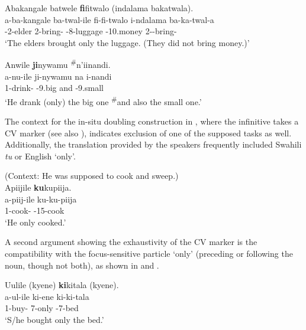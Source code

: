\documentclass[output=paper]{langscibook}
\begin{document}
\ea
\label{bkm:Ref56943215}
Abakangale batwele \textbf{fi}fitwalo (indalama bakatwala).\\
\gll
a-ba-kangale  ba-twal-ile  fi-fi-twalo  i-ndalama  ba-ka-twal-a\\
\AUG{}-2-elder  2\SM{}-bring-\PFV{}  \EXH{}-8-luggage  \AUG{}-10.money  2\SM-\NEG{}-bring-\FV{}\\
\glt
‘The elders brought only the luggage. (They did not bring money.)’ \citep[336]{vanderWalLusekelo2022}\\

\z
\pagebreak

\ea
\label{bkm:Ref56945748}
Anwile \textbf{ji}nywamu \textsuperscript{\#}n’iinandi.\\
\gll
a-nu-ile  ji-nywamu  na  i-nandi\\
1\SM{}-drink-\PFV{}  \EXH{}-9.big  and  \AUG{}-9.small\\
\glt
‘He drank (only) the big one \textsuperscript{\#}and also the small one.’ \citep[336]{vanderWalLusekelo2022}\\

\z


The context for the in-situ doubling construction in , where the infinitive takes a CV marker (see also ), indicates exclusion of one of the supposed tasks as well. Additionally, the translation provided by the speakers frequently included Swahili \textit{tu} or English ‘only’.

\ea
\label{bkm:Ref56943235}
(Context: He was supposed to cook and sweep.)\\
Apiijile \textbf{ku}kupiija.\\
\gll
a-piij-ile  ku-ku-piija\\
1\SM{}-cook-\PFV{}  \EXH{}-15-cook\\
\glt
‘He only cooked.’ \citep[336]{vanderWalLusekelo2022}\\

\z


A second argument showing the exhaustivity of the CV marker is the compatibility with the focus-sensitive particle ‘only’ (preceding or following the noun, though not both), as shown in  and .

\ea
\label{bkm:Ref122591578}
Uulile (kyene) \textbf{ki}kitala (kyene).\\
\gll
a-ul-ile  ki-ene  ki-ki-tala\\
1\SM{}-buy-\PFV{}  7-only  \EXH{}-7-bed\\
\glt
‘S/he bought only the bed.’ \citep[336]{vanderWalLusekelo2022}\\
\end{document}
